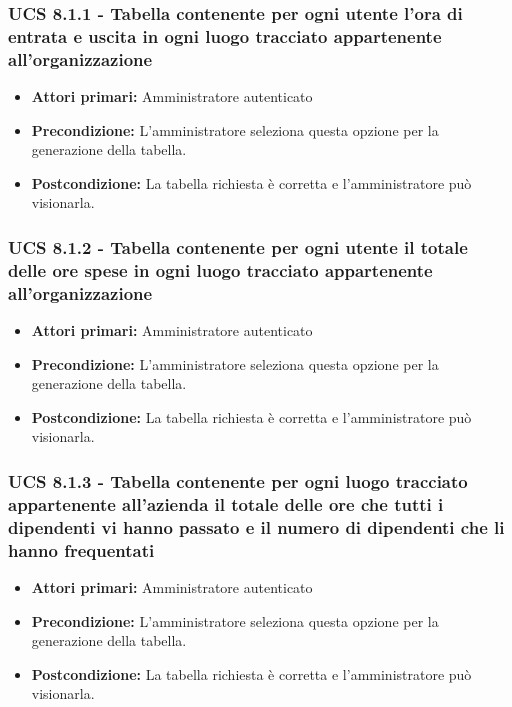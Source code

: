 \subsubsection{UCS 8.1.1 - Tabella contenente per ogni utente l'ora di entrata e uscita in ogni luogo tracciato appartenente all'organizzazione}%
\begin{itemize}
\item \textbf{Attori primari:} Amministratore autenticato
\item \textbf{Precondizione:} L'amministratore seleziona questa opzione per la generazione della tabella.
\item \textbf{Postcondizione:} La tabella richiesta è corretta e l'amministratore può visionarla.
\end{itemize}

\subsubsection{UCS 8.1.2 - Tabella contenente per ogni utente il totale delle ore spese in ogni luogo tracciato appartenente all'organizzazione}%
\begin{itemize}
\item \textbf{Attori primari:} Amministratore autenticato
\item \textbf{Precondizione:} L'amministratore seleziona questa opzione per la generazione della tabella.
\item \textbf{Postcondizione:} La tabella richiesta è corretta e l'amministratore può visionarla.
\end{itemize}

\subsubsection{UCS 8.1.3 - Tabella contenente per ogni luogo tracciato appartenente all'azienda il totale delle ore che tutti i dipendenti vi hanno passato e il numero di dipendenti che li hanno frequentati}%
\begin{itemize}
\item \textbf{Attori primari:} Amministratore autenticato
\item \textbf{Precondizione:} L'amministratore seleziona questa opzione per la generazione della tabella.
\item \textbf{Postcondizione:} La tabella richiesta è corretta e l'amministratore può visionarla.
\end{itemize}


